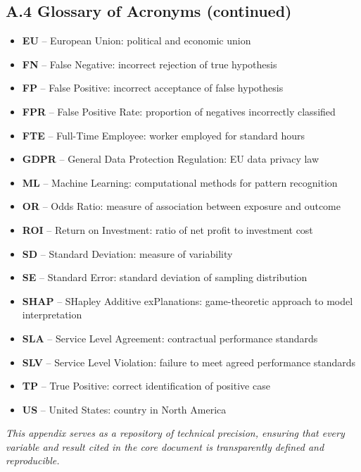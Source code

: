 \documentclass[12pt,letterpaper]{article}
\begin{document}
\newpage
\subsection*{A.4 Glossary of Acronyms (continued)}

\begin{itemize}
    \item \textbf{EU} -- European Union: political and economic union
    \item \textbf{FN} -- False Negative: incorrect rejection of true hypothesis
    \item \textbf{FP} -- False Positive: incorrect acceptance of false hypothesis
    \item \textbf{FPR} -- False Positive Rate: proportion of negatives incorrectly classified
    \item \textbf{FTE} -- Full-Time Employee: worker employed for standard hours
    \item \textbf{GDPR} -- General Data Protection Regulation: EU data privacy law
    \item \textbf{ML} -- Machine Learning: computational methods for pattern recognition
    \item \textbf{OR} -- Odds Ratio: measure of association between exposure and outcome
    \item \textbf{ROI} -- Return on Investment: ratio of net profit to investment cost
    \item \textbf{SD} -- Standard Deviation: measure of variability
    \item \textbf{SE} -- Standard Error: standard deviation of sampling distribution
    \item \textbf{SHAP} -- SHapley Additive exPlanations: game-theoretic approach to model interpretation
    \item \textbf{SLA} -- Service Level Agreement: contractual performance standards
    \item \textbf{SLV} -- Service Level Violation: failure to meet agreed performance standards
    \item \textbf{TP} -- True Positive: correct identification of positive case
    \item \textbf{US} -- United States: country in North America
\end{itemize}

\vspace{1em}

\noindent\textit{This appendix serves as a repository of technical precision, ensuring that every variable and result cited in the core document is transparently defined and reproducible.}



\end{document}
